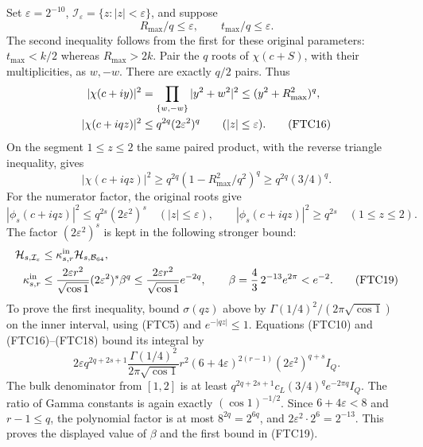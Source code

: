 Set $\varepsilon=2^{-10}$, $\mathcal I_\varepsilon=\{z:|z|<\varepsilon\}$,
and suppose
\begin{equation}
 R_{\max}/q\le\varepsilon,\qquad t_{\max}/q\le\varepsilon.
 \tag{FTC15}
\end{equation}
The second inequality follows from the first for these original parameters:
$t_{\max}<k/2$ whereas $R_{\max}>2k$.
Pair the $q$ roots of $\chi(c+S)$, with their multiplicities, as $w,-w$.
There are exactly $q/2$ pairs.  Thus
\begin{align}
 |\chi(c+iy)|^2
 &=\prod_{\{w,-w\}}|y^2+w^2|^2
 \le(y^2+R_{\max}^2)^q,\notag\\
 |\chi(c+iqz)|^2
 &\le q^{2q}(2\varepsilon^2)^q
 \qquad (|z|\le\varepsilon).
 \tag{FTC16}
\end{align}
On the segment $1\le z\le2$ the same paired product, with the reverse
triangle inequality, gives
\begin{equation}
 |\chi(c+iqz)|^2
 \ge q^{2q}(1-R_{\max}^2/q^2)^q
 \ge q^{2q}(3/4)^q.
 \tag{FTC17}
\end{equation}
For the numerator factor, the original roots give
\begin{equation}
 |\phi_s(c+iqz)|^2\le q^{2s}(2\varepsilon^2)^s
 \quad (|z|\le\varepsilon),\qquad
 |\phi_s(c+iqz)|^2\ge q^{2s}
 \quad (1\le z\le2).
 \tag{FTC18}
\end{equation}
The factor $(2\varepsilon^2)^s$ is kept in the following stronger bound:
\begin{align}
 \mathcal H_{s,\mathcal I_\varepsilon}
 &\le\kappa_{s,r}^{\mathrm{in}}\mathcal H_{s,\mathcal B_{64}},\notag\\
 \kappa_{s,r}^{\mathrm{in}}
 &\le\frac{2\varepsilon r^2}{\sqrt{\cos1}}
 (2\varepsilon^2)^s\beta^q
 \le\frac{2\varepsilon r^2}{\sqrt{\cos1}}e^{-2q},
 \qquad \beta=\frac43\,2^{-13}e^{2\pi}<e^{-2}.
 \tag{FTC19}
\end{align}
To prove the first inequality, bound $\sigma(qz)$ above by
$\Gamma(1/4)^2/(2\pi\sqrt{\cos1})$ on the inner interval, using (FTC5)
and $e^{-|qz|}\le1$.  Equations (FTC10) and (FTC16)--(FTC18) bound its
integral by
\[
 2\varepsilon q^{2q+2s+1}
 \frac{\Gamma(1/4)^2}{2\pi\sqrt{\cos1}}
 r^2(6+4\varepsilon)^{2(r-1)}
 (2\varepsilon^2)^{q+s}I_Q.
\]
The bulk denominator from $[1,2]$ is at least
$q^{2q+2s+1}c_L(3/4)^qe^{-2\pi q}I_Q$.
The ratio of Gamma constants is again exactly $(\cos1)^{-1/2}$.
Since $6+4\varepsilon<8$ and $r-1\le q$, the polynomial factor is at
most $8^{2q}=2^{6q}$, and
$2\varepsilon^2\cdot2^6=2^{-13}$.  This proves the displayed value of
$\beta$ and the first bound in (FTC19).

